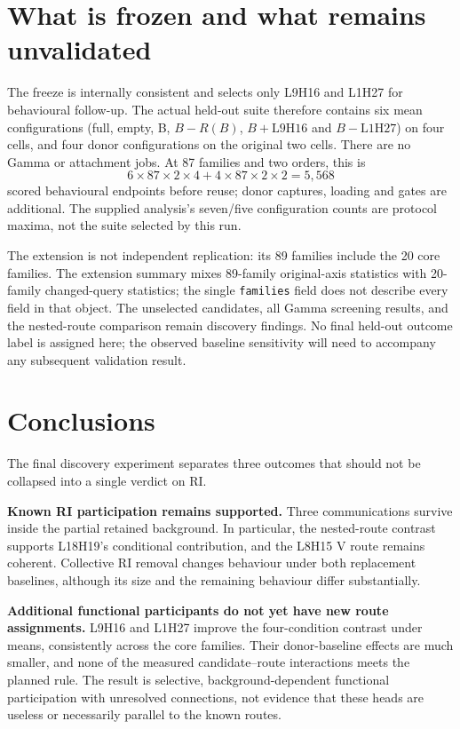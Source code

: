 \documentclass[11pt,a4paper]{article}
\newcommand{\file}[1]{\nolinkurl{#1}}
\begin{document}
\section{What is frozen and what remains unvalidated}
The freeze is internally consistent and selects only L9H16 and L1H27 for
behavioural follow-up. The actual held-out suite therefore contains six mean
configurations (full, empty, B, $B-R(B)$, $B+\mathrm{L9H16}$ and
$B-\mathrm{L1H27}$) on four cells, and four donor configurations on the original
two cells. There are no Gamma or attachment jobs. At 87 families and two orders,
this is
\[
6\times87\times2\times4+4\times87\times2\times2=5{,}568
\]
scored behavioural endpoints before reuse; donor captures, loading and gates
are additional. The supplied analysis's seven/five configuration counts are
protocol maxima, not the suite selected by this run.

The extension is not independent replication: its 89 families include the 20
core families. The extension summary mixes 89-family original-axis statistics
with 20-family changed-query statistics; the single \file{families} field does
not describe every field in that object. The unselected candidates, all Gamma
screening results, and the nested-route comparison remain discovery findings.
No final held-out outcome label is assigned here; the observed baseline
sensitivity will need to accompany any subsequent validation result.

\section{Conclusions}
The final discovery experiment separates three outcomes that should not be
collapsed into a single verdict on RI.

\textbf{Known RI participation remains supported.} Three communications survive
inside the partial retained background. In particular, the nested-route contrast
supports L18H19's conditional contribution, and the L8H15 V route remains
coherent. Collective RI removal changes behaviour under both replacement
baselines, although its size and the remaining behaviour differ substantially.

\textbf{Additional functional participants do not yet have new route assignments.}
L9H16 and L1H27 improve the four-condition contrast under means, consistently
across the core families. Their donor-baseline effects are much smaller, and
none of the measured candidate--route interactions meets the planned rule.
The result is selective, background-dependent functional participation with
unresolved connections, not evidence that these heads are useless or necessarily
parallel to the known routes.
\end{document}
